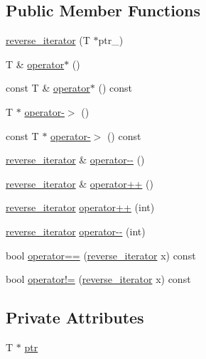 \subsection*{Public Member Functions}
\begin{DoxyCompactItemize}
\item 
\mbox{\hyperlink{classprevector_1_1reverse__iterator_adcb8cb50c73bf5712bb8a2b66d744e4c}{reverse\+\_\+iterator}} (T $\ast$ptr\+\_\+)
\item 
T \& \mbox{\hyperlink{classprevector_1_1reverse__iterator_a9ab6a3cb472b0d62c0c940c269c01498}{operator$\ast$}} ()
\item 
const T \& \mbox{\hyperlink{classprevector_1_1reverse__iterator_aa2ef16e7b5aa8be262b55cba85aa0f20}{operator$\ast$}} () const
\item 
T $\ast$ \mbox{\hyperlink{classprevector_1_1reverse__iterator_a453be8c12070833336dbcd0187893492}{operator-\/$>$}} ()
\item 
const T $\ast$ \mbox{\hyperlink{classprevector_1_1reverse__iterator_a20b6d44e5c7788fdc906b50c926acfb0}{operator-\/$>$}} () const
\item 
\mbox{\hyperlink{classprevector_1_1reverse__iterator}{reverse\+\_\+iterator}} \& \mbox{\hyperlink{classprevector_1_1reverse__iterator_abce3eff5c64cec50415a27044ea46266}{operator-\/-\/}} ()
\item 
\mbox{\hyperlink{classprevector_1_1reverse__iterator}{reverse\+\_\+iterator}} \& \mbox{\hyperlink{classprevector_1_1reverse__iterator_a5ca20ca29a06eca5ae7b11bdd9c8d116}{operator++}} ()
\item 
\mbox{\hyperlink{classprevector_1_1reverse__iterator}{reverse\+\_\+iterator}} \mbox{\hyperlink{classprevector_1_1reverse__iterator_a061d083208c9bc184d9ea6bcbc3cf239}{operator++}} (int)
\item 
\mbox{\hyperlink{classprevector_1_1reverse__iterator}{reverse\+\_\+iterator}} \mbox{\hyperlink{classprevector_1_1reverse__iterator_af7b715f1ac105425675557654af85d49}{operator-\/-\/}} (int)
\item 
bool \mbox{\hyperlink{classprevector_1_1reverse__iterator_af18719632237a298ba4145fc677b05d8}{operator==}} (\mbox{\hyperlink{classprevector_1_1reverse__iterator}{reverse\+\_\+iterator}} x) const
\item 
bool \mbox{\hyperlink{classprevector_1_1reverse__iterator_ab77234832f8d03e55510a13290954ba4}{operator!=}} (\mbox{\hyperlink{classprevector_1_1reverse__iterator}{reverse\+\_\+iterator}} x) const
\end{DoxyCompactItemize}
\subsection*{Private Attributes}
\begin{DoxyCompactItemize}
\item 
T $\ast$ \mbox{\hyperlink{classprevector_1_1reverse__iterator_a4ba7614268ebf6b172dc9b77a192dc9d}{ptr}}
\end{DoxyCompactItemize}


